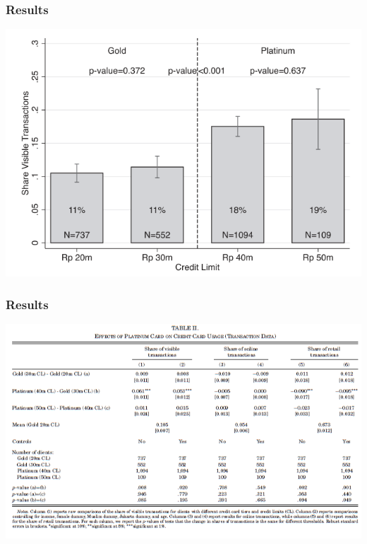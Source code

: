 \documentclass[unicode,12pt]{beamer}
\begin{document}
    \begin{frame}
        \frametitle{Results}
    
        \centerline{\includegraphics[width = \linewidth]{0717kato/result_obs.PNG}}
    
    \end{frame}

    \begin{frame}
        \frametitle{Results}
    
        \centerline{\includegraphics[width = \linewidth]{0717kato/result_obs2.PNG}}
    
    \end{frame}
\end{document}

